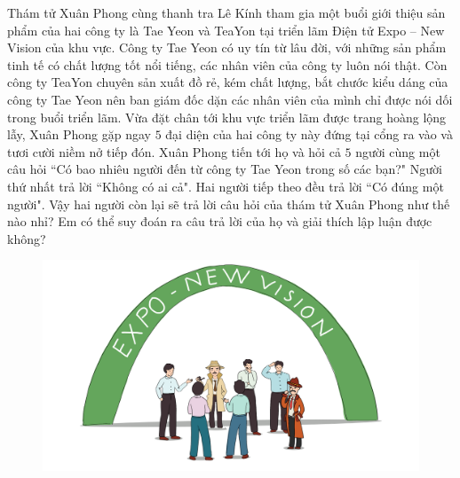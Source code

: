 \begin{multicols}{2}
	Thám tử Xuân Phong cùng thanh tra Lê Kính tham gia một buổi giới thiệu sản phẩm của hai công ty là Tae Yeon và TeaYon tại triển lãm Điện tử Expo -- New Vision của khu vực. Công ty  Tae Yeon có uy tín từ lâu đời, với những sản phẩm tinh tế có chất lượng tốt nổi tiếng,  các nhân viên của công ty luôn nói thật. Còn công ty TeaYon chuyên sản xuất đồ rẻ, kém chất lượng, bắt chước kiểu dáng của công ty Tae Yeon nên ban giám đốc dặn các nhân viên của mình chỉ được nói dối trong buổi triển lãm. 
	\vskip 0.1cm
	Vừa đặt chân tới khu vực triển lãm được trang hoàng lộng lẫy, Xuân Phong gặp ngay $5$ đại diện  của hai công ty này đứng tại cổng ra vào và tươi cười niềm nở tiếp đón. Xuân Phong tiến tới họ và hỏi cả $5$ người cùng một câu hỏi ``Có bao nhiêu người đến từ công ty Tae Yeon trong số các bạn?" 
	\vskip 0.1cm
	Người thứ nhất trả lời ``Không có ai cả". Hai người tiếp theo đều trả lời ``Có đúng một người". 
	\vskip 0.1cm
	Vậy hai người còn lại sẽ trả lời câu hỏi của thám tử Xuân Phong như thế nào nhỉ? Em có thể suy đoán ra câu trả lời của họ và giải thích lập luận được không?
%	
\end{multicols}
	\begin{figure}[H]
		\centering
		\vspace*{-5pt}
		\captionsetup{labelformat= empty, justification=centering}
		\includegraphics[width=1\linewidth]{xuanphong}
		\vspace*{-5pt}
		\end{figure}
